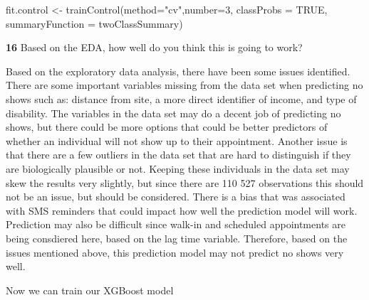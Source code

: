\documentclass[
]{article}
\newenvironment{Shaded}{\begin{snugshade}}{\end{snugshade}}
\newcommand{\AttributeTok}[1]{\textcolor[rgb]{0.77,0.63,0.00}{#1}}
\newcommand{\ConstantTok}[1]{\textcolor[rgb]{0.00,0.00,0.00}{#1}}
\newcommand{\DecValTok}[1]{\textcolor[rgb]{0.00,0.00,0.81}{#1}}
\newcommand{\FunctionTok}[1]{\textcolor[rgb]{0.00,0.00,0.00}{#1}}
\newcommand{\NormalTok}[1]{#1}
\newcommand{\OtherTok}[1]{\textcolor[rgb]{0.56,0.35,0.01}{#1}}
\newcommand{\StringTok}[1]{\textcolor[rgb]{0.31,0.60,0.02}{#1}}
\begin{document}
\begin{Shaded}
\begin{Highlighting}[]
\NormalTok{fit.control }\OtherTok{\textless{}{-}} \FunctionTok{trainControl}\NormalTok{(}\AttributeTok{method=}\StringTok{"cv"}\NormalTok{,}\AttributeTok{number=}\DecValTok{3}\NormalTok{,}
                           \AttributeTok{classProbs =} \ConstantTok{TRUE}\NormalTok{, }\AttributeTok{summaryFunction =}\NormalTok{ twoClassSummary)}
\end{Highlighting}
\end{Shaded}

\textbf{16} Based on the EDA, how well do you think this is going to
work?

Based on the exploratory data analysis, there have been some issues
identified. There are some important variables missing from the data set
when predicting no shows such as: distance from site, a more direct
identifier of income, and type of disability. The variables in the data
set may do a decent job of predicting no shows, but there could be more
options that could be better predictors of whether an individual will
not show up to their appointment. Another issue is that there are a few
outliers in the data set that are hard to distinguish if they are
biologically plausible or not. Keeping these individuals in the data set
may skew the results very slightly, but since there are 110 527
observations this should not be an issue, but should be considered.
There is a bias that was associated with SMS reminders that could impact
how well the prediction model will work. Prediction may also be
difficult since walk-in and scheduled appointments are being consdiered
here, based on the lag time variable. Therefore, based on the issues
mentioned above, this prediction model may not predict no shows very
well.

Now we can train our XGBoost model
\end{document}
